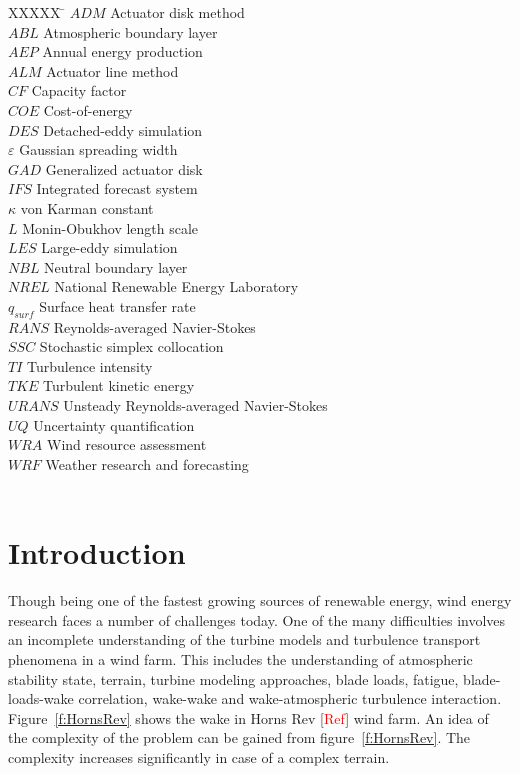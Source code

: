 \documentclass[]{aiaa-tc}%
\begin{document}
\begin{tabbing}
  XXXXX \= \kill%
  $ADM$ \> Actuator disk method \\
  $ABL$ \> Atmospheric boundary layer \\
  $AEP$ \> Annual energy production \\
  $ALM$ \> Actuator line method \\
  $CF$ \> Capacity factor\\
  $COE$ \> Cost-of-energy \\
  $DES$ \> Detached-eddy simulation \\
  $\varepsilon$ \>Gaussian spreading width \\
  $GAD$ \> Generalized actuator disk \\
  $IFS$ \> Integrated forecast system \\
  $\kappa$ \> von Karman constant \\
  $L$ \> Monin-Obukhov length scale\\
  $LES$ \> Large-eddy simulation \\
  $NBL$ \> Neutral boundary layer \\
  $NREL$ \> National Renewable Energy Laboratory \\
  $q_{surf}$ \> Surface heat transfer rate \\
  $RANS$ \> Reynolds-averaged Navier-Stokes \\
  $SSC$ \> Stochastic simplex collocation \\
  $TI$ \> Turbulence intensity \\
  $TKE$ \> Turbulent kinetic energy \\
  $URANS$ \> Unsteady Reynolds-averaged Navier-Stokes \\
  $UQ$ \> Uncertainty quantification \\
  $WRA$ \> Wind resource assessment \\
  $WRF$ \> Weather research and forecasting\\
  $$ \>
 \end{tabbing}

\section{Introduction} \label{intro}
Though being one of the fastest growing sources of renewable energy, wind energy research faces a number of challenges today. One of the many difficulties involves an incomplete understanding of the turbine models and turbulence transport phenomena in a wind farm. This includes the understanding of atmospheric stability state, terrain, turbine modeling approaches, blade loads, fatigue, blade-loads-wake correlation, wake-wake and wake-atmospheric turbulence interaction.  Figure~\ref{f:HornsRev} shows the wake in Horns Rev [\textcolor{red}{Ref}] wind farm. An idea of the complexity of the problem can be gained from figure~\ref{f:HornsRev}. The complexity increases significantly in case of a complex terrain.
\end{document}
